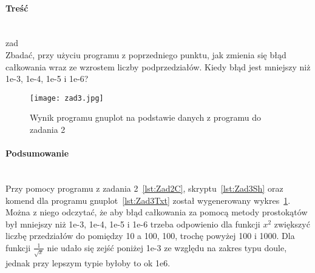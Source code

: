 \paragraph{Treść}~\\
{zad}\\
Zbadać, przy użyciu programu z poprzedniego punktu, jak zmienia się błąd całkowania wraz ze wzrostem liczby podprzedziałów.
Kiedy błąd jest mniejszy niż 1e-3, 1e-4, 1e-5 i 1e-6?





\begin{figure}[p]
  \caption{Wynik programu gnuplot na podstawie danych z programu do zadania 2}
  \label{fig:Zad3Jpg}
  \centering
  \texttt{[image: zad3.jpg]}
\end{figure}

\paragraph{Podsumowanie}~\\
Przy pomocy programu z zadania 2~\ref{lst:Zad2C}, skryptu~\ref{lst:Zad3Sh} oraz komend dla programu gnuplot~\ref{lst:Zad3Txt} został wygenerowany wykres~\ref{fig:Zad3Jpg}.
Można z niego odczytać, że aby błąd całkowania za pomocą metody prostokątów był mniejszy niż 1e-3, 1e-4, 1e-5 i 1e-6 trzeba odpowienio dla funkcji $ x^2 $ zwiększyć liczbę przedziałów do pomiędzy 10 a 100, 100, trochę powyżej 100 i 1000.
Dla funkcji $ \frac{1}{\sqrt{x}} $ nie udało się zejść poniżej 1e-3 ze względu na zakres typu doule, jednak przy lepszym typie byłoby to ok 1e6.
